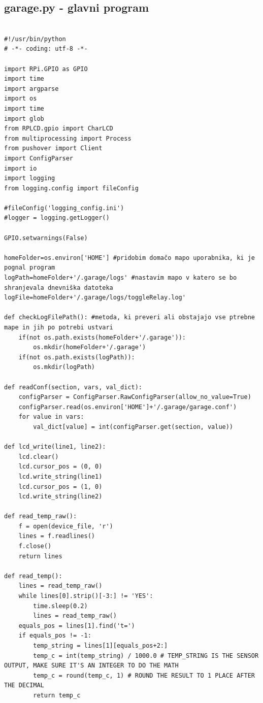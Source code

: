\documentclass[11pt]{article}
\begin{document}
\subsection{garage.py - glavni program}
\begin{verbatim}

#!/usr/bin/python
# -*- coding: utf-8 -*-

import RPi.GPIO as GPIO
import time
import argparse
import os
import time
import glob
from RPLCD.gpio import CharLCD
from multiprocessing import Process
from pushover import Client
import ConfigParser
import io
import logging
from logging.config import fileConfig

#fileConfig('logging_config.ini')
#logger = logging.getLogger()

GPIO.setwarnings(False)

homeFolder=os.environ['HOME'] #pridobim domačo mapo uporabnika, ki je pognal program
logPath=homeFolder+'/.garage/logs' #nastavim mapo v katero se bo shranjevala dnevniška datoteka
logFile=homeFolder+'/.garage/logs/toggleRelay.log'

def checkLogFilePath(): #metoda, ki preveri ali obstajajo vse ptrebne mape in jih po potrebi ustvari
    if(not os.path.exists(homeFolder+'/.garage')):
        os.mkdir(homeFolder+'/.garage')
    if(not os.path.exists(logPath)):
        os.mkdir(logPath)

def readConf(section, vars, val_dict):
    configParser = ConfigParser.RawConfigParser(allow_no_value=True)
    configParser.read(os.environ['HOME']+'/.garage/garage.conf')
    for value in vars:
        val_dict[value] = int(configParser.get(section, value))

def lcd_write(line1, line2):
    lcd.clear()
    lcd.cursor_pos = (0, 0)
    lcd.write_string(line1)
    lcd.cursor_pos = (1, 0)
    lcd.write_string(line2)

def read_temp_raw():
    f = open(device_file, 'r')
    lines = f.readlines()
    f.close()
    return lines

def read_temp():
    lines = read_temp_raw()
    while lines[0].strip()[-3:] != 'YES':
        time.sleep(0.2)
        lines = read_temp_raw()
    equals_pos = lines[1].find('t=')
    if equals_pos != -1:
        temp_string = lines[1][equals_pos+2:]
        temp_c = int(temp_string) / 1000.0 # TEMP_STRING IS THE SENSOR OUTPUT, MAKE SURE IT'S AN INTEGER TO DO THE MATH
        temp_c = round(temp_c, 1) # ROUND THE RESULT TO 1 PLACE AFTER THE DECIMAL
        return temp_c


\end{verbatim}
\end{document}
